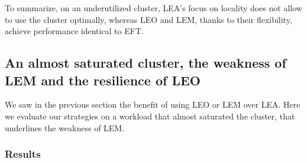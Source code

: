 \documentclass[conference,10pt]{IEEEtran}
\begin{document}
To summarize, on an underutilized cluster, LEA's focus on locality
does not allow to use the cluster optimally, whereas LEO and LEM, thanks
to their flexibility,
achieve performance identical to EFT.

\subsection{An almost saturated cluster, the weakness of LEM and the resilience of LEO}\label{sec.09-09}

We saw in the previous section the benefit of using LEO or LEM over LEA.
Here we evaluate our strategies on a workload that almost saturated the
cluster, that underlines the weakness of LEM.

\subsubsection{Results}
\end{document}
